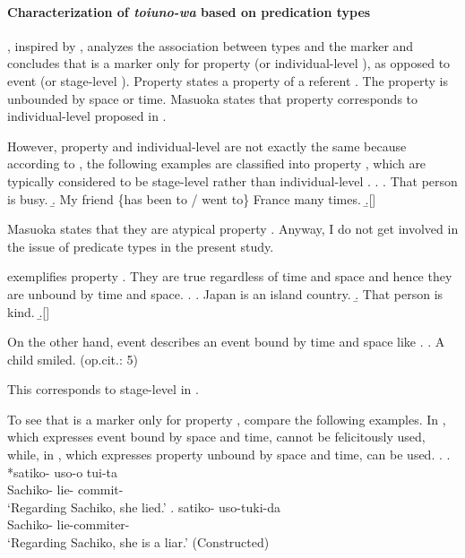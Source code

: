 \paragraph{Characterization of \textit{toiuno-wa} based on {predication} types}

, inspired by ,
analyzes the association between  types and
the marker  and concludes that
 is a  marker only for property  (or individual-level ),
as opposed to event  (or stage-level ).
Property  states a property of a referent \cite{masuoka87,masuoka08}.
The property is unbounded by space or time.
Masuoka states that property  corresponds to
individual-level  proposed in .%
 \footnotemark
 \footnotetext
 {
 However, property  and individual-level  are
 not exactly the same because
 according to ,
 the following examples are classified into property ,
 which are typically considered to be stage-level  rather than
 individual-level .
 \ex.
  \a. That person is busy.
  \b. My friend \{has been to / went to\} France many times.
  \b.[] \hfill{\cite[5--6, translated by NN]{masuoka08p}}
 
 Masuoka states that they are atypical property .
 Anyway, I do not get involved in the issue of predicate types in the present study.
 }
\Next exemplifies property .
They are true regardless of time and space and hence
they are unbound by time and space.
%
\ex.
 \a. Japan is an island country.
 \b. That person is kind.
 \b.[] \hfill{\cite[4, translated by NN]{masuoka08p}}

On the other hand,
event  describes an event bound by time and space like \Next.
%
\ex. A child smiled.  \hfill{(op.cit.: 5)}

This corresponds to stage-level  in .

To see that  is a marker only for property ,
compare the following examples.
In \Next[a], which expresses event  bound by space and time,
 cannot be felicitously used,
while, in \Next[b], which expresses property 
unbound by space and time,
 can be used.
%
\ex.\label{ExSatiko}
\ag. *satiko- uso-o tui-ta \\
     Sachiko- lie- commit- \\
     `Regarding Sachiko, she lied.'
     \hfill{\cite[96]{masuoka12}}
\bg. satiko- uso-tuki-da \\
     Sachiko- lie-commiter- \\
     `Regarding Sachiko, she is a liar.'
     \hfill{(Constructed)}


